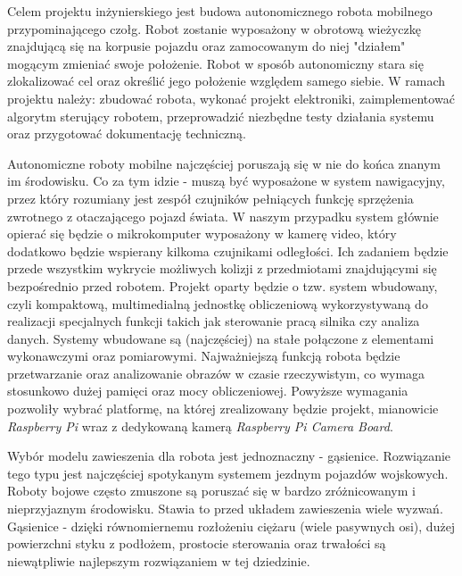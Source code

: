 Celem projektu inżynierskiego jest budowa autonomicznego robota mobilnego przypominającego czołg. Robot zostanie wyposażony w obrotową wieżyczkę znajdującą się na korpusie pojazdu oraz zamocowanym do niej "działem" mogącym zmieniać swoje położenie. Robot w sposób autonomiczny stara się zlokalizować cel oraz określić jego położenie względem samego siebie. W ramach projektu należy: zbudować robota, wykonać projekt elektroniki, zaimplementować algorytm sterujący robotem, przeprowadzić niezbędne testy działania systemu oraz przygotować dokumentację techniczną.

Autonomiczne roboty mobilne najczęściej poruszają się w nie do końca znanym im środowisku. Co za tym idzie - muszą być wyposażone w system nawigacyjny, przez który rozumiany jest zespół czujników pełniących funkcję sprzężenia zwrotnego z otaczającego pojazd świata. W naszym przypadku system głównie opierać się będzie o mikrokomputer wyposażony w kamerę video, który dodatkowo będzie wspierany kilkoma czujnikami odległości. Ich zadaniem będzie przede wszystkim wykrycie możliwych kolizji z przedmiotami znajdującymi się bezpośrednio przed robotem. Projekt oparty będzie o tzw. system wbudowany, czyli kompaktową, multimedialną jednostkę obliczeniową wykorzystywaną do realizacji specjalnych funkcji takich jak sterowanie pracą silnika czy analiza danych. Systemy wbudowane są (najczęściej) na stałe połączone z elementami wykonawczymi oraz pomiarowymi. Najważniejszą funkcją robota będzie przetwarzanie oraz analizowanie obrazów w czasie rzeczywistym, co wymaga stosunkowo dużej pamięci oraz mocy obliczeniowej. Powyższe wymagania pozwoliły wybrać platformę, na której zrealizowany będzie projekt, mianowicie \textit{Raspberry Pi} wraz z dedykowaną kamerą \textit{Raspberry Pi Camera Board}. 

Wybór modelu zawieszenia dla robota jest jednoznaczny - gąsienice. Rozwiązanie tego typu jest najczęściej spotykanym systemem jezdnym pojazdów wojskowych. Roboty bojowe często zmuszone są poruszać się w bardzo zróżnicowanym i nieprzyjaznym środowisku. Stawia to przed układem zawieszenia wiele wyzwań.  Gąsienice - dzięki równomiernemu rozłożeniu ciężaru (wiele pasywnych osi), dużej powierzchni styku z podłożem, prostocie sterowania oraz trwałości są niewątpliwie najlepszym rozwiązaniem w tej dziedzinie.
